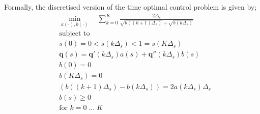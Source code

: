 Formally, the discretised version of the time optimal control problem is given by;
\begin{align*}
&\min_{a(\cdot),b(\cdot)} \quad \sum_{k=0}^{K}\frac{2\Delta_s}{\sqrt{b((k+1)\Delta_s)} + \sqrt{b(k\Delta_s)}}\\
&\text{subject to }\\
&s(0) = 0 < s(k\Delta_s) < 1 = s(K\Delta_s)\\
&\ddot{\textbf{q}}(s) = \textbf{q}'(k\Delta_s)a(s) + \textbf{q}''(k\Delta_s)b(s)\\
&b(0) = 0\\
&b(K\Delta_s) = 0\\
&\left(b((k+1)\Delta_s) - b(k\Delta_s)\right) = 2a(k\Delta_s)\Delta_s\\
&b(s) \geq 0\\
&\text{for }k=0\; ... \;K
\end{align*}